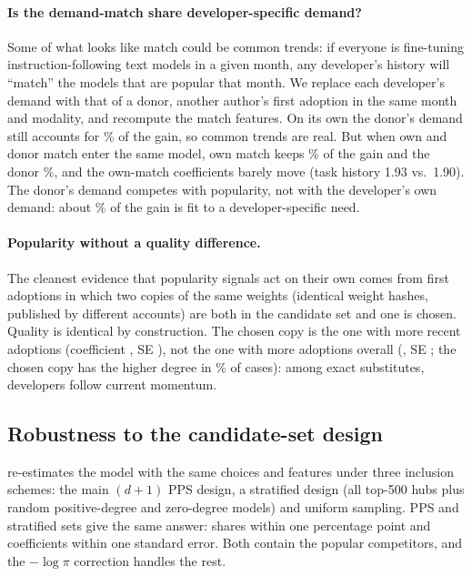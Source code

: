\paragraph{Is the demand-match share developer-specific demand?}
Some of what looks like match could be common trends: if everyone is fine-tuning instruction-following text models
in a given month, any developer's history will ``match'' the models that are popular that month. We replace each
developer's demand with that of a donor, another author's first adoption in the same month and modality, and
recompute the match features. On its own the donor's demand still accounts for \placeboAlone\% of the gain, so common
trends are real. But when own and donor match enter the same model, own match keeps \jointOwn\% of the gain and the
donor \jointDonor\%, and the own-match coefficients barely move (task history 1.93 vs.\ 1.90). The donor's demand
competes with popularity, not with the developer's own demand: about \jointOwn\% of the gain is fit to a
developer-specific need.

\paragraph{Popularity without a quality difference.}
The cleanest evidence that popularity signals act on their own comes from \idN{} first adoptions in which two copies
of the same weights (identical weight hashes, published by different accounts) are both in the candidate set and
one is chosen. Quality is identical by construction. The chosen copy is the one with more recent adoptions
(coefficient \idRec, SE \idRecSe), not the one with more adoptions overall (\idDeg, SE \idDegSe; the chosen copy has
the higher degree in \idHigher\% of cases): among exact substitutes, developers follow current momentum.



\subsection{Robustness to the candidate-set design}
\label{sec:robustq}
 re-estimates the model with the same choices and features under three inclusion schemes: the main
$(d+1)$ PPS design, a stratified design (all top-500 hubs plus random positive-degree and zero-degree models) and
uniform sampling. PPS and stratified sets give the same answer: shares within one percentage point and coefficients
within one standard error. Both contain the popular competitors, and the $-\log\pi$ correction handles the rest.

